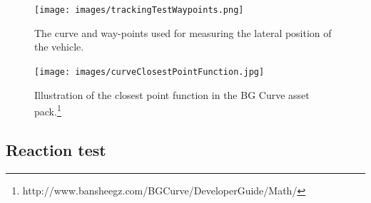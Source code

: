 \begin{figure}[h]
    \centering
	\texttt{[image: images/trackingTestWaypoints.png]}
	\caption[
		tracking test way-points
	]{
		The curve and way-points used for measuring the lateral position of the vehicle.
	}
	\label{figure:trackingWaypoints}
\end{figure}

\begin{figure}[h]
    \centering
	\texttt{[image: images/curveClosestPointFunction.jpg]}
	\caption[
		curve closest point function
	]{
		Illustration of the closest point function in the BG Curve asset pack.\footnote{http://www.bansheegz.com/BGCurve/DeveloperGuide/Math/}
	}
	\label{figure:curveClosestPoint}
\end{figure}

\subsection{Reaction test}
\label{subsection:reaction test}

